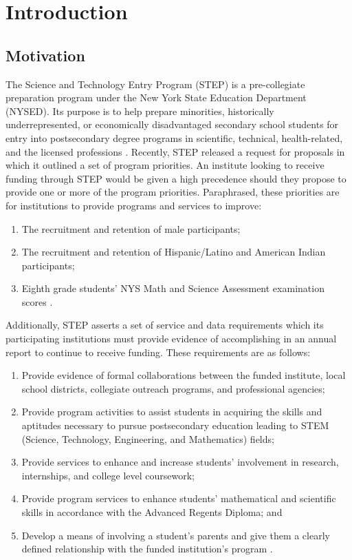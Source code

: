 \chapter{Introduction}
\label{chap:introduction}

\section{Motivation}
\label{sec:motivation}

The Science and Technology Entry Program (STEP) is a pre-collegiate preparation program under the New York State Education Department (NYSED). Its purpose is to help prepare minorities, historically underrepresented, or economically disadvantaged secondary school students for entry into postsecondary degree programs in scientific, technical, health-related, and the licensed professions \cite{nysed-step-website}. Recently, STEP released a request for proposals in which it outlined a set of program priorities. An institute looking to receive funding through STEP would be given a high precedence should they propose to provide one or more of the program priorities. Paraphrased, these priorities are for institutions to provide programs and services to improve:
\begin{enumerate}[\indent P1.]
	\item The recruitment and retention of male participants;
	\item The recruitment and retention of Hispanic/Latino and American Indian participants;
	\item Eighth grade students' NYS Math and Science Assessment examination scores \cite{nys-step-op-manual}.
\end{enumerate}

Additionally, STEP asserts a set of service and data requirements which its participating institutions must provide evidence of accomplishing in an annual report to continue to receive funding. These requirements are as follows:
\begin{enumerate}[\indent R1.]
	\item Provide evidence of formal collaborations between the funded institute, local school districts, collegiate outreach programs, and professional agencies;
	\item Provide program activities to assist students in acquiring the skills and aptitudes necessary to pursue postsecondary education leading to STEM (Science, Technology, Engineering, and Mathematics) fields;
	\item Provide services to enhance and increase students' involvement in research, internships, and college level coursework;
	\item Provide program services to enhance students' mathematical and scientific skills in accordance with the Advanced Regents Diploma; and
	\item Develop a means of involving a student's parents and give them a clearly defined relationship with the funded institution's program \cite{nys-step-op-manual}.
\end{enumerate}

